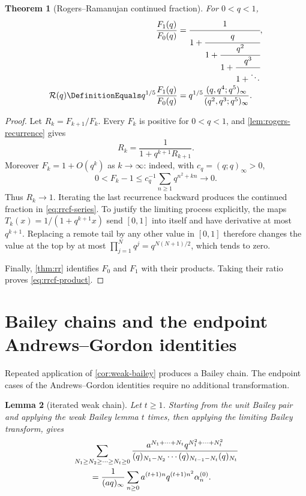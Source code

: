 \documentclass[11pt,oneside]{article}
\newtheorem{theorem}{Theorem}[section]
\newtheorem{lemma}[theorem]{Lemma}
\theoremstyle{definition}
\newcommand{\RR}{\mathcal R}
\begin{document}
\begin{theorem}[Rogers--Ramanujan continued fraction]\label{thm:rrcf}
For $0<q<1$,
\begin{align}
 \frac{F_1(q)}{F_0(q)}
 &=
 \cfrac{1}{1+\cfrac{q}{1+\cfrac{q^2}{1+\cfrac{q^3}{1+\ddots}}}},
 \label{eq:rrcf-series}\\
 \RR(q)
 \DefinitionEquals q^{1/5}\frac{F_1(q)}{F_0(q)}
 &=
 q^{1/5}
 \frac{(q,q^4;q^5)_\infty}{(q^2,q^3;q^5)_\infty}.
 \label{eq:rrcf-product}
\end{align}
\end{theorem}

\begin{proof}
Let $R_k=F_{k+1}/F_k$.  Every $F_k$ is positive for $0<q<1$, and
\cref{lem:rogers-recurrence} gives
\[
 R_k=\frac1{1+q^{k+1}R_{k+1}}.
\]
Moreover $F_k=1+O(q^k)$ as $k\to\infty$: indeed, with
$c_q=(q;q)_\infty>0$,
\[
 0<F_k-1
 \le c_q^{-1}\sum_{n\ge1}q^{n^2+kn}\longrightarrow0.
\]
Thus $R_k\to1$.  Iterating the last recurrence backward produces the
continued fraction in \eqref{eq:rrcf-series}.  To justify the limiting
process explicitly, the maps
$T_k(x)=1/(1+q^{k+1}x)$ send $[0,1]$ into itself and have derivative at
most $q^{k+1}$.  Replacing a remote tail by any other value in $[0,1]$
therefore changes the value at the top by at most
$\prod_{j=1}^{N}q^j=q^{N(N+1)/2}$, which tends to zero.

Finally, \cref{thm:rr} identifies $F_0$ and $F_1$ with their products.
Taking their ratio proves \eqref{eq:rrcf-product}.
\end{proof}


\section{Bailey chains and the endpoint Andrews--Gordon identities}
\label{sec:andrews-gordon}

Repeated application of \cref{cor:weak-bailey} produces a Bailey chain.
The endpoint cases of the Andrews--Gordon identities require no
additional transformation.

\begin{lemma}[iterated weak chain]\label{lem:iterated-chain}
Let $t\ge1$.  Starting from the unit Bailey pair and applying the weak
Bailey lemma $t$ times, then applying the limiting Bailey transform, gives
\begin{align}
&\sum_{N_1\ge N_2\ge\cdots\ge N_t\ge0}
 \frac{a^{N_1+\cdots+N_t}
 q^{N_1^2+\cdots+N_t^2}}
 {(q)_{N_1-N_2}\cdots(q)_{N_{t-1}-N_t}(q)_{N_t}}
 \notag\\
&\qquad=
 \frac1{(aq)_\infty}
 \sum_{n\ge0}a^{(t+1)n}q^{(t+1)n^2}\alpha_n^{(0)}.
\label{eq:iterated-chain}
\end{align}
\end{lemma}
\end{document}
